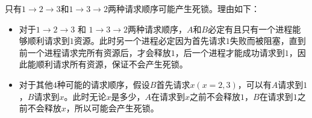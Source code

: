 
\begin{solution}

只有$1 \to 2 \to 3$和$1 \to 3 \to 2$两种请求顺序可能产生死锁。理由如下：

\begin{itemize}
    \item 对于$1 \to 2 \to 3$ 和 $1 \to 3 \to 2$两种请求顺序，$A$和$B$必定有且只有一个进程能够顺利请求到$1$资源。此时另一个进程必定因为首先请求$1$失败而被阻塞，直到前一个进程请求完所有资源后，才会释放$1$，后一个进程才能成功请求到$1$，因此能顺利请求所有资源，保证不会产生死锁。
    \item 对于其他$4$种可能的请求顺序，假设$B$首先请求$x(x=2,3)$，可以有$A$请求到$1$，$B$请求到$x$。此时无论$x$是多少，$A$在请求到$x$之前不会释放$1$，$B$在请求到$1$之前不会释放$x$，所以可能会产生死锁。
\end{itemize}

\end{solution}
